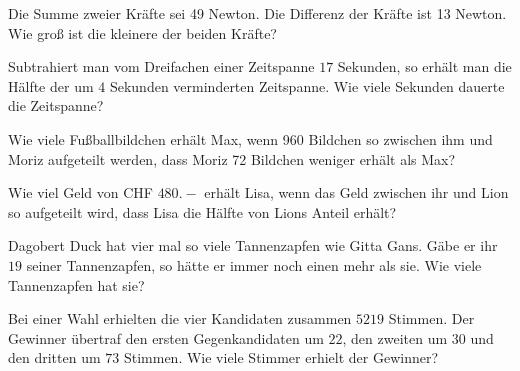 \begin{bbwAufgabenBlock}


\item Die Summe zweier Kräfte sei 49 Newton. Die Differenz der Kräfte
ist 13 Newton. Wie groß ist die kleinere der beiden Kräfte?


\item Subtrahiert man vom Dreifachen einer Zeitspanne $17$ Sekunden, so
erhält man die Hälfte der um $4$ Sekunden verminderten Zeitspanne. Wie
viele Sekunden dauerte die Zeitspanne?


\noTRAINER{\newpage}

\item Wie viele Fußballbildchen erhält Max, wenn 960 Bildchen so
zwischen ihm und Moriz aufgeteilt werden, dass Moriz 72 Bildchen
weniger erhält als Max?



\item Wie viel Geld von CHF $480.-$ erhält Lisa, wenn das Geld
zwischen ihr und Lion so aufgeteilt wird, dass Lisa die Hälfte von
Lions Anteil erhält?


\item Dagobert Duck hat vier mal so viele Tannenzapfen wie Gitta
Gans. Gäbe er ihr $19$ seiner Tannenzapfen, so hätte er immer noch einen
mehr als sie. Wie viele Tannenzapfen hat sie?


\item Bei einer Wahl erhielten die vier Kandidaten zusammen $5219$
Stimmen. Der Gewinner übertraf den ersten Gegenkandidaten um $22$, den
zweiten um $30$ und den dritten um $73$ Stimmen. Wie viele Stimmer erhielt
der Gewinner?



\end{bbwAufgabenBlock}


\platzFuerBerechnungenBisEndeSeite{}%
%
